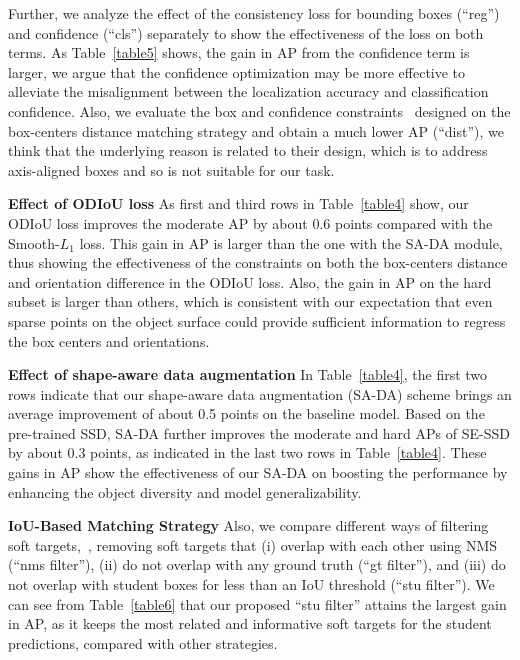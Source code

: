 \documentclass[letterpaper]{article}
\begin{document}
Further, we analyze the effect of the consistency loss for bounding boxes (``reg'') and confidence  (``cls'') separately to show the effectiveness of the loss on both terms.
As Table~\ref{table5} shows, the gain in AP from the confidence term is larger, we argue that the confidence optimization may be more effective to alleviate the misalignment between the localization accuracy and classification confidence.
Also, we evaluate the box and confidence constraints~\cite{zhao2020sess} designed on the box-centers distance matching strategy and obtain a much lower AP (``dist''), we think that the underlying reason is related to their design, which is to address axis-aligned boxes and so is not suitable for our task.


\textbf{Effect of ODIoU loss}
As first and third rows in Table~\ref{table4} show, our ODIoU loss improves the moderate AP by about 0.6 points compared with the Smooth-$L_1$ loss.
This gain in AP is larger than the one with the SA-DA module, thus showing the effectiveness of the constraints on both the box-centers distance and orientation difference in the ODIoU loss.
Also, the gain in AP on the hard subset is larger than others, which is consistent with our expectation that even sparse points on the object surface could provide sufficient information to regress the box centers and orientations.


\textbf{Effect of shape-aware data augmentation}
In Table~\ref{table4}, the first two rows indicate that our shape-aware data augmentation (SA-DA) scheme brings an average improvement of about 0.5 points on the baseline model.
Based on the pre-trained SSD,  SA-DA further improves the moderate and hard APs of SE-SSD by about 0.3 points, as indicated in the last two rows in Table~\ref{table4}.
These gains in AP show the effectiveness of our SA-DA on boosting the performance by enhancing the object diversity and model generalizability.


\textbf{IoU-Based Matching Strategy}
Also, we compare different ways of filtering soft targets,~\ie, removing soft targets that
(i) overlap with each other using NMS (``nms filter''),
(ii) do not overlap with any ground truth (``gt filter''), and
(iii) do not overlap with student boxes for less than an IoU threshold (``stu filter'').
We can see from Table~\ref{table6} that our proposed ``stu filter'' attains the largest gain in AP, as it keeps the most related and informative soft targets for the student predictions, compared with other strategies.
\end{document}

